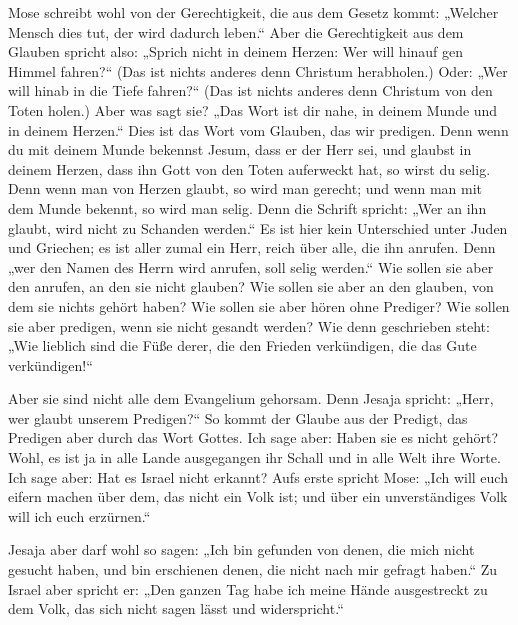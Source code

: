  Mose schreibt wohl von der Gerechtigkeit, die aus dem
Gesetz kommt: „Welcher Mensch dies tut, der wird dadurch leben.``
 Aber die Gerechtigkeit aus dem Glauben spricht also:
„Sprich nicht in deinem Herzen: Wer will hinauf gen Himmel fahren?{}``
(Das ist nichts anderes denn Christum herabholen.)  Oder:
„Wer will hinab in die Tiefe fahren?{}`` (Das ist nichts anderes denn
Christum von den Toten holen.)  Aber was sagt sie? „Das
Wort ist dir nahe, in deinem Munde und in deinem Herzen.`` Dies ist das
Wort vom Glauben, das wir predigen.  Denn wenn du mit
deinem Munde bekennst Jesum, dass er der Herr sei, und glaubst in deinem
Herzen, dass ihn Gott von den Toten auferweckt hat, so wirst du selig.
 Denn wenn man von Herzen glaubt, so wird man gerecht;
und wenn man mit dem Munde bekennt, so wird man selig. 
Denn die Schrift spricht: „Wer an ihn glaubt, wird nicht zu Schanden
werden.``  Es ist hier kein Unterschied unter Juden und
Griechen; es ist aller zumal ein Herr, reich über alle, die ihn anrufen.
 Denn „wer den Namen des Herrn wird anrufen, soll selig
werden.``  Wie sollen sie aber den anrufen, an den sie
nicht glauben? Wie sollen sie aber an den glauben, von dem sie nichts
gehört haben? Wie sollen sie aber hören ohne Prediger? 
Wie sollen sie aber predigen, wenn sie nicht gesandt werden? Wie denn
geschrieben steht: „Wie lieblich sind die Füße derer, die den Frieden
verkündigen, die das Gute verkündigen!{}``

 Aber sie sind nicht alle dem Evangelium gehorsam. Denn
Jesaja spricht: „Herr, wer glaubt unserem Predigen?{}`` 
So kommt der Glaube aus der Predigt, das Predigen aber durch das Wort
Gottes.  Ich sage aber: Haben sie es nicht gehört? Wohl,
es ist ja in alle Lande ausgegangen ihr Schall und in alle Welt ihre
Worte.  Ich sage aber: Hat es Israel nicht erkannt? Aufs
erste spricht Mose: „Ich will euch eifern machen über dem, das nicht ein
Volk ist; und über ein unverständiges Volk will ich euch erzürnen.``

 Jesaja aber darf wohl so sagen: „Ich bin gefunden von
denen, die mich nicht gesucht haben, und bin erschienen denen, die nicht
nach mir gefragt haben.``  Zu Israel aber spricht er:
„Den ganzen Tag habe ich meine Hände ausgestreckt zu dem Volk, das sich
nicht sagen lässt und widerspricht.``


